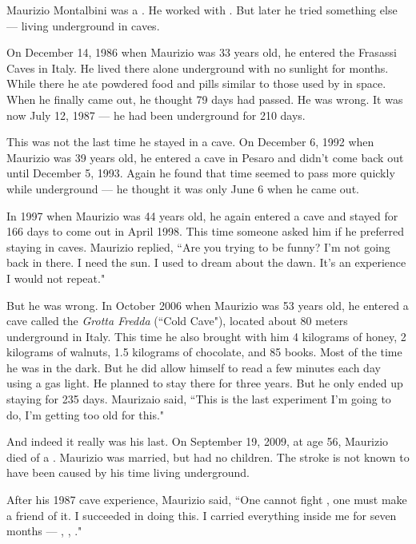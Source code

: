 
Maurizio Montalbini was a .
He worked with .
But later he tried something else --- living underground in caves.

On December 14, 1986 when Maurizio was 33 years old, he entered the Frasassi Caves in Italy.
He lived there alone underground with no sunlight for months.
While there he ate powdered food and pills similar to those used by  in space.
When he finally came out, he thought 79 days had passed.
He was wrong.
It was now July 12, 1987 --- he had been underground for 210 days.

This was not the last time he stayed in a cave.
On December 6, 1992 when Maurizio was 39 years old,
he entered a cave in Pesaro and didn't come back out until December 5, 1993.
Again he found that time seemed to pass more quickly while underground ---
he thought it was only June 6 when he came out.

In 1997 when Maurizio was 44 years old,
he again entered a cave and stayed for 166 days to come out in April 1998.
This time someone asked him if he preferred staying in caves.
Maurizio replied,
``Are you trying to be funny? I'm not going back in there.
I need the sun. I used to dream about the dawn.
It's an experience I would not repeat."

But he was wrong.
In October 2006 when Maurizio was 53 years old,
he entered a cave called the \emph{Grotta Fredda} (``Cold Cave"), located about 80 meters underground in Italy.
This time he also brought with him 4 kilograms of honey, 2 kilograms of walnuts, 1.5 kilograms of chocolate,
and 85 books.
Most of the time he was in the dark. But he did allow himself to read a few minutes each day using a gas light.
He planned to stay there for three years.
But he only ended up staying for 235 days.
Maurizaio said,
``This is the last experiment I'm going to do, I'm getting too old for this."

And indeed it really was his last.
On September 19, 2009, at age 56, Maurizio died of a .
Maurizio was married, but had no children.
The stroke is not known to have been caused by his time living underground.

After his 1987 cave experience, Maurizio said,
``One cannot fight , one must make a friend of it.
I succeeded in doing this. I carried everything inside me for seven months ---
, , ."%

